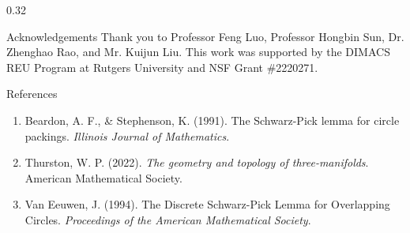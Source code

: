 \documentclass[final]{beamer}
\begin{document}
\begin{frame}[t]
\begin{columns}[T]
\begin{column}{0.32\linewidth}
            \begin{block}{Acknowledgements}
                Thank you to Professor Feng Luo, Professor Hongbin Sun, Dr. Zhenghao Rao, and Mr. Kuijun Liu. This work was supported by the DIMACS REU Program at Rutgers University and NSF Grant \#2220271.
            \end{block}

            \begin{block}{References}
                \footnotesize{
                \begin{enumerate}
                    \item Beardon, A. F., \& Stephenson, K. (1991). The Schwarz-Pick lemma for circle packings. \textit{Illinois Journal of Mathematics}.
                    \item Thurston, W. P. (2022). \textit{The geometry and topology of three-manifolds}. American Mathematical Society.
                    \item Van Eeuwen, J. (1994). The Discrete Schwarz-Pick Lemma for Overlapping Circles. \textit{Proceedings of the American Mathematical Society}.
                \end{enumerate}
                }
            \end{block}

        \end{column}
    \end{columns}
\end{frame}
\end{document}
